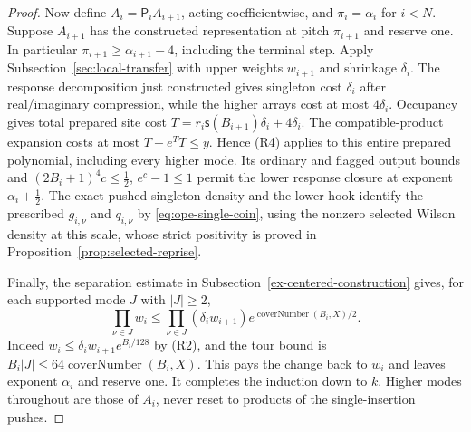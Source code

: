 \begin{proof}
Now define $A_i=\mathsf P_i A_{i+1}$, acting coefficientwise, and
$\pi_i=\alpha_i$ for $i<N$. Suppose $A_{i+1}$ has the constructed
representation at pitch $\pi_{i+1}$ and reserve one. In particular
$\pi_{i+1}\ge\alpha_{i+1}-4$, including the terminal step. Apply
Subsection~\ref{sec:local-transfer} with upper weights $w_{i+1}$ and
shrinkage $\delta_i$. The response decomposition just constructed gives singleton cost
$\delta_i$ after real/imaginary compression, while the higher arrays
cost at most $4\delta_i$. Occupancy gives total prepared site cost
$T=r_i\mathsf s(B_{i+1})\delta_i+4\delta_i$.
The compatible-product expansion costs at most $T+e^TT\le y$.
Hence (R4) applies to this entire prepared polynomial, including every
higher mode. Its ordinary and flagged output bounds and
$(2B_i+1)^4c\le\tfrac12$, $e^c-1\le1$ permit the lower response
closure at exponent $\alpha_i+\tfrac12$. The exact pushed singleton
density and the lower hook identify the prescribed $g_{i,\nu}$ and
$q_{i,\nu}$ by \eqref{eq:ope-single-coin}, using the nonzero selected
Wilson density at this scale, whose strict positivity is proved in
Proposition~\ref{prop:selected-reprise}.

Finally, the separation estimate in
Subsection~\ref{ex-centered-construction} gives, for each supported mode
$J$ with $|J|\ge2$,
\[
 \prod_{\nu\in J}w_i
 \le\prod_{\nu\in J}(\delta_iw_{i+1})
       e^{\operatorname{coverNumber}(B_i,X)/2}.
\]
Indeed $w_i\le\delta_iw_{i+1}e^{B_i/128}$ by (R2), and the tour
bound is $B_i|J|\le64\operatorname{coverNumber}(B_i,X)$.
This pays the change back to $w_i$ and leaves exponent $\alpha_i$ and
reserve one. It completes the induction down to $k$. Higher modes
throughout are those of $A_i$, never reset to products of the
single-insertion pushes.


\end{proof}
